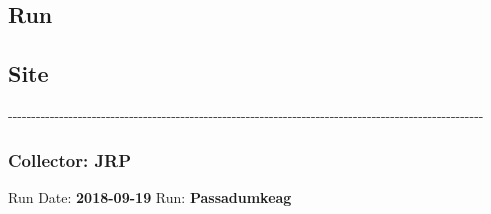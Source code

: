 \documentclass[
  letterpaper,
  DIV=11,
  numbers=noendperiod]{scrartcl}
\begin{document}
\hypertarget{run}{%
\subsection{Run}\label{run}}

\hypertarget{site}{%
\subsection{Site}\label{site}}

-\/-\/-\/-\/-\/-\/-\/-\/-\/-\/-\/-\/-\/-\/-\/-\/-\/-\/-\/-\/-\/-\/-\/-\/-\/-\/-\/-\/-\/-\/-\/-\/-\/-\/-\/-\/-\/-\/-\/-\/-\/-\/-\/-\/-\/-\/-\/-\/-\/-\/-\/-\/-\/-\/-\/-\/-\/-\/-\/-\/-\/-\/-\/-\/-\/-\/-\/-\/-\/-\/-\/-\/-\/-\/-\/-\/-\/-\/-\/-\/-\/-\/-\/-\/-\/-\/-\/-\/-\/-\/-\/-\/-\/-\/-\/-\/-\/-\/-\/-\/-\/-

\hypertarget{collector-jrp}{%
\subsubsection{Collector: JRP}\label{collector-jrp}}

Run Date: \textbf{2018-09-19} Run: \textbf{Passadumkeag}
\end{document}
